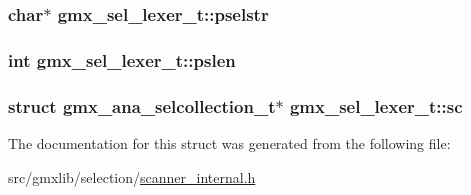 \hypertarget{structgmx__sel__lexer__t_aecab18de208e7f67e3122ae29178f560}{
\subsubsection[{pselstr}]{\setlength{\rightskip}{0pt plus 5cm}char$\ast$ {\bf gmx\-\_\-sel\-\_\-lexer\-\_\-t\-::pselstr}}}\label{structgmx__sel__lexer__t_aecab18de208e7f67e3122ae29178f560}
\hypertarget{structgmx__sel__lexer__t_a8a8b8fba445d21818367f101c5253aa1}{
\subsubsection[{pslen}]{\setlength{\rightskip}{0pt plus 5cm}int {\bf gmx\-\_\-sel\-\_\-lexer\-\_\-t\-::pslen}}}\label{structgmx__sel__lexer__t_a8a8b8fba445d21818367f101c5253aa1}
\hypertarget{structgmx__sel__lexer__t_a82dc052b54870d8ea2770036c241af08}{
\subsubsection[{sc}]{\setlength{\rightskip}{0pt plus 5cm}struct {\bf gmx\-\_\-ana\-\_\-selcollection\-\_\-t}$\ast$ {\bf gmx\-\_\-sel\-\_\-lexer\-\_\-t\-::sc}}}\label{structgmx__sel__lexer__t_a82dc052b54870d8ea2770036c241af08}


\-The documentation for this struct was generated from the following file\-:\begin{DoxyCompactItemize}
\item 
src/gmxlib/selection/\hyperlink{scanner__internal_8h}{scanner\-\_\-internal.\-h}\end{DoxyCompactItemize}

